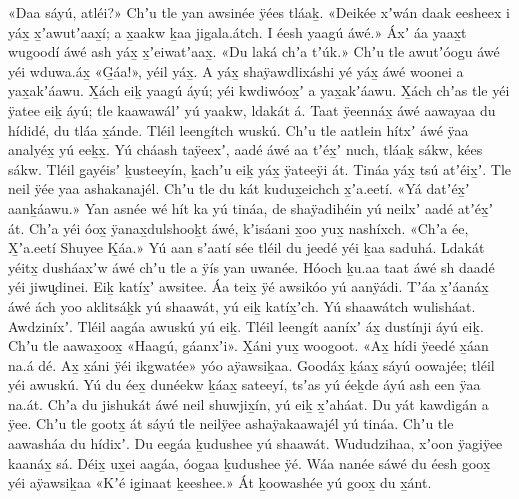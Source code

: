 \begin{pairs}
\begin{Leftside}
«\!Daa sáyú, atléi?\!»
Chʼu tle yan awsinée ÿées tláaḵ.
«\!Deikée xʼwán daak eesheex i yáx̱ x̱ʼawutʼaax̱í;
a x̱aakw ḵaa jigala.átch.
I éesh yaagú áwé.\!»
Áxʼ áa yaax̱t wugoodí áwé ash yáx̱ x̱ʼeiwatʼaax̱.
«\!Du laká chʼa tʼúk.\!»
Chʼu tle awutʼóogu áwé yéi wduwa.áx̱ «\!G̱áa!\!», yéil yáx̱.
A yáx̱ shaÿawdlixáshi yé yáx̱ áwé woonei a yax̱a\-kʼáawu.
X̱ách eiḵ yaagú áyú;
yéi kwdiwóox̱ʼ a yax̱akʼáawu.
X̱ách chʼas tle yéi ÿatee eiḵ áyú;
tle kaawawálʼ yú yaakw, ldakát á.
Taat ÿeennáx̱ áwé aawayaa du hídidé, du tláa x̱ánde.
Tléil leengítch wuskú.
\pend
\pstart
{}Chʼu tle aatlein hítxʼ áwé ÿaa analyéx̱ yú eeḵx̱.
Yú cháash taÿeexʼ, aadé áwé aa tʼéx̱ʼ nuch, tláaḵ sákw, kées sákw.
Tléil g̱ayéisʼ ḵusteeyín, ḵachʼu eiḵ yáx̱ ÿateeÿi át.
Tináa yáx̱ tsú atʼéix̱ʼ.
Tle neil ÿée yaa ashakanajél.
Chʼu tle du kát kudux̱eichch x̱ʼa.eetí.
«\!Yá datʼéx̱ʼ aanḵáawu.\!»
Yan asnée wé hít ka yú tináa, de shaÿadihéin yú neilxʼ aadé atʼéx̱ʼ át.
Chʼa yéi óox̱ ÿanax̱dulshooḵt áwé, kʼisáani x̱oo yux̱ nashíxch.
«\!Chʼa ée, X̱ʼa.eetí Shuyee Ḵáa.\!»
\pend
\pstart
{}Yú aan sʼaatí sée tléil du jeedé yéi ḵaa saduhá.
Ldakát yéitx̱ dusháaxʼw áwé chʼu tle a ÿís yan uwanée.
Hóoch ḵu.aa taat áwé sh daadé yéi jiwu̬dinei.
Eiḵ katíx̱ʼ awsitee.
Áa teix̱ ÿé awsikóo yú aanÿádi.
Tʼáa x̱ʼáa\-náx̱ áwé ách yoo aklitsáḵk yú shaawát, yú eiḵ katíx̱ʼch.
Yú shaawátch wulisháat.
Aw\-dziníxʼ.
Tléil aag̱áa awuskú yú eiḵ.
Tléil leen\-gít aaníxʼ áx̱ dustínji áyú eiḵ.
Chʼu tle aawax̱oox̱ «\!Haagú, gáanxʼi\!».
X̱áni yux̱ woogoot.
«\!Ax̱ hídi ÿeedé x̱áan na.á dé.
Ax̱ x̱áni ÿéi ikg̱watée\!»
yóo aÿawsiḵaa.
Goodáx̱ ḵáax̱ sáyú oowajée;
tléil yéi awus\-kú.
Yú du éex̱ dunéekw ḵáax̱ sateeyí, tsʼas yú éeḵde áyú ash een ÿaa na.át.
Chʼa du jishukát áwé neil shuwjix̱ín, yú eiḵ x̱ʼaháat.
Du yát kawdigán a ÿee.
Chʼu tle gootx̱ át sáyú tle neilÿee ashaÿakaawajél yú tináa.
Chʼu tle aawasháa du hídixʼ.
\pend
\pstart
{}Du eeg̱áa ḵudushee yú shaawát.
Wu\-dudzihaa, xʼoon ÿagiÿee kaanáx̱ sá.
Déix̱ ux̱ei aag̱áa, óog̱aa ḵudushee ÿé.
Wáa nanée sáwé du éesh goox̱ yéi aÿawsiḵaa
«\!Kʼé ig̱inaat ḵeeshee.\!»
Át ḵoowashée yú goox̱ du x̱ánt.

\end{Leftside}
\end{pairs}
